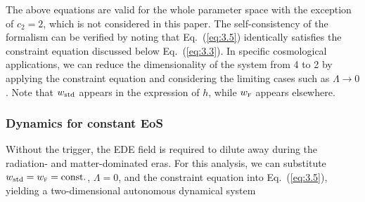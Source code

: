 \documentclass[aps,prd,twocolumn]{revtex4-2}
\newcommand\subF{\textsc{f}}
\newcommand\substd{{\rm std}}
\begin{document}
The above equations are valid for the whole parameter space with the exception of $c_2=2$, which is not considered in this paper. The self-consistency of the formalism can be verified by noting that Eq.~(\ref{eq:3.5}) identically satisfies the constraint equation discussed below Eq.~(\ref{eq:3.3}). In specific cosmological applications, we can reduce the dimensionality of the system from 4 to 2 by applying the constraint equation and considering the limiting cases such as $\Lambda\rightarrow0$. Note that $w_\substd$ appears in the expression of $h$, while $w_\subF$ appears elsewhere. 

\subsubsection{Dynamics for constant EoS}\label{sec:III.A.2}
Without the trigger, the EDE field is required to dilute away during the radiation- and matter-dominated eras. For this analysis, we can substitute $w_\substd=w_\subF={\rm const.}$, $\Lambda=0$, and the constraint equation into Eq.~(\ref{eq:3.5}), yielding a two-dimensional autonomous dynamical system
\end{document}
